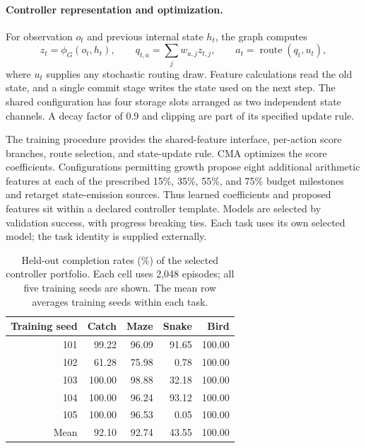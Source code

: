 \paragraph{Controller representation and optimization.}
For observation $o_t$ and previous internal state $h_t$, the graph computes
\begin{equation}
 z_t=\phi_G(o_t,h_t),\qquad
 q_{t,a}=\sum_j w_{a,j}z_{t,j},\qquad
 a_t=\operatorname{route}(q_t,u_t),
\label{eq:revision_action_model}
\end{equation}
where $u_t$ supplies any stochastic routing draw. Feature calculations read the
old state, and a single commit stage writes the state used on the next step.
The shared configuration has four storage slots arranged as two independent
state channels. A decay factor of 0.9 and clipping are part of its specified
update rule.

The training procedure provides the shared-feature interface, per-action score
branches, route selection, and state-update rule. CMA optimizes the score
coefficients. Configurations permitting growth propose eight additional
arithmetic features at each of the prescribed 15\%, 35\%, 55\%, and 75\%
budget milestones and retarget state-emission sources. Thus learned coefficients
and proposed features sit within a declared controller template. Models are
selected by validation success, with progress breaking ties. Each task uses
its own selected model; the task identity is supplied externally.

\begin{table}[tb]
\centering
\small
\caption{Held-out completion rates (\%) of the selected controller portfolio.
Each cell uses 2,048 episodes; all five training seeds are shown. The mean row
averages training seeds within each task.}
\label{tab:revision_action_seeds}
\begin{tabular}{rrrrr}
\toprule
Training seed & Catch & Maze & Snake & Bird \\
\midrule
101 & 99.22 & 96.09 & 91.65 & 100.00 \\
102 & 61.28 & 75.98 & 0.78 & 100.00 \\
103 & 100.00 & 98.88 & 32.18 & 100.00 \\
104 & 100.00 & 96.24 & 93.12 & 100.00 \\
105 & 100.00 & 96.53 & 0.05 & 100.00 \\
\midrule
Mean & 92.10 & 92.74 & 43.55 & 100.00 \\
\bottomrule
\end{tabular}
\end{table}

